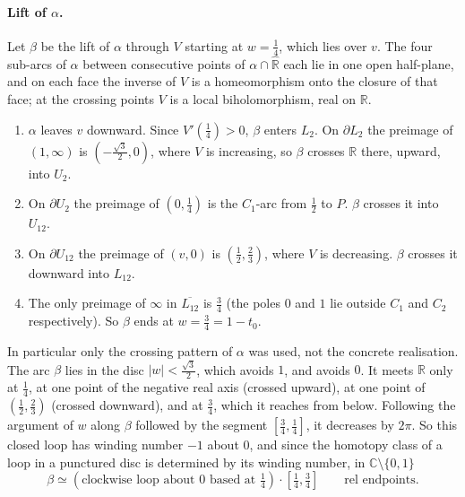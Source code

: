 \documentclass[11pt]{article}
\theoremstyle{definition}
\newcommand{\Rh}{\hat{\mathbb R}}
\begin{document}
\paragraph{Lift of $\alpha$.} Let $\beta$ be the lift of $\alpha$ through $V$ starting at $w=\tfrac14$, which lies over $v$. The four sub-arcs of $\alpha$ between consecutive points of $\alpha\cap\Rh$ each lie in one open half-plane, and on each face the inverse of $V$ is a homeomorphism onto the closure of that face; at the crossing points $V$ is a local biholomorphism, real on $\mathbb R$.
\begin{enumerate}[label=\textup{\arabic*.},nosep]
\item $\alpha$ leaves $v$ downward. Since $V'(\tfrac14)>0$, $\beta$ enters $L_2$. On $\partial L_2$ the preimage of $(1,\infty)$ is $(-\tfrac{\sqrt3}2,0)$, where $V$ is increasing, so $\beta$ crosses $\mathbb R$ there, upward, into $U_2$.
\item On $\partial U_2$ the preimage of $(0,\tfrac14)$ is the $C_1$-arc from $\tfrac12$ to $P$. $\beta$ crosses it into $U_{12}$.
\item On $\partial U_{12}$ the preimage of $(v,0)$ is $(\tfrac12,\tfrac23)$, where $V$ is decreasing. $\beta$ crosses it downward into $L_{12}$.
\item The only preimage of $\infty$ in $\overline{L_{12}}$ is $\tfrac34$ (the poles $0$ and $1$ lie outside $C_1$ and $C_2$ respectively). So $\beta$ ends at $w=\tfrac34=1-t_0$.
\end{enumerate}
In particular only the crossing pattern of $\alpha$ was used, not the concrete realisation. The arc $\beta$ lies in the disc $|w|<\tfrac{\sqrt3}2$, which avoids $1$, and avoids $0$. It meets $\mathbb R$ only at $\tfrac14$, at one point of the negative real axis (crossed upward), at one point of $(\tfrac12,\tfrac23)$ (crossed downward), and at $\tfrac34$, which it reaches from below. Following the argument of $w$ along $\beta$ followed by the segment $[\tfrac34,\tfrac14]$, it decreases by $2\pi$. So this closed loop has winding number $-1$ about $0$, and since the homotopy class of a loop in a punctured disc is determined by its winding number, in $\mathbb C\setminus\{0,1\}$
\begin{equation}\label{eq:beta}
\beta\simeq(\text{clockwise loop about }0\text{ based at }\tfrac14)\cdot[\tfrac14,\tfrac34]\qquad\text{rel endpoints}.
\end{equation}
\end{document}
